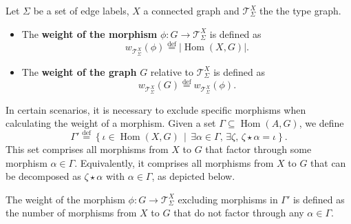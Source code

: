\begin{definition} 
    \label{def:weight_t_sigma_x}
    Let $\Sigma$ be a set of edge labels, \( X \) a connected graph and $\mathcal{T}_\Sigma^X$ the the type graph.
    \begin{itemize}
        \item The \textbf{weight of the morphism} \( \phi : G \mathop{\to} \mathcal{T}_\Sigma^X\) is defined as
        \[ 
            w_{\mathcal{T}_\Sigma^X}(\phi) \overset{\operatorname{def}}{=} \left| \operatorname{Hom}(X, G) \right|.
        \]
        \item The \textbf{weight of the graph} \( G \) relative to \( \mathcal{T}_\Sigma^X\) is defined as
        \[
            w_{\mathcal{T}_\Sigma^X}(G) \overset{\operatorname{def}}{=} w_{\mathcal{T}_\Sigma^X}(\phi).
        \]
    \end{itemize}
\end{definition}

In certain scenarios, it is necessary to exclude specific morphisms when calculating the weight of a morphism. Given a set \( \Gamma \mathop{\subseteq} \operatorname{Hom}(A, G) \), we define\todo{}
\[
    \Gamma' \overset{\operatorname{def}}{=} \left\{ \iota \mathop{\in} \operatorname{Hom}(X, G) \,\middle|\, \exists \alpha \mathop{\in} \Gamma,\, \exists \zeta,\, \zeta \mathop{\star} \alpha \mathop{=} \iota \right\}.
\]
This set comprises all morphisms from \( X \) to \( G \) that factor through some morphism \( \alpha \mathop{\in} \Gamma \). Equivalently, it comprises all morphisms from \( X \) to \( G \) that can be decomposed as \( \zeta \mathop{\star} \alpha \) with \( \alpha \mathop{\in} \Gamma \), as depicted below.

\begin{center}
\end{center}

The weight of the morphism \( \phi : G \mathop{\to} \mathcal{T}_\Sigma^X\) excluding morphisms in \( \Gamma' \) is defined as the number of morphisms from \( X \) to \( G \) that do not factor through any \( \alpha \mathop{\in} \Gamma \).

